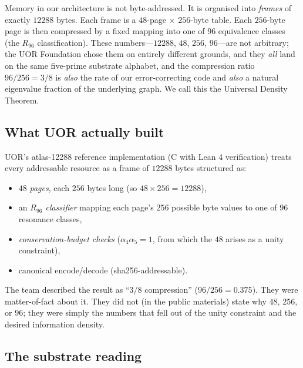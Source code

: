 \documentclass[11pt,letterpaper]{article}
\theoremstyle{remark}
\begin{document}
\begin{plainenglish}
Memory in our architecture is not byte-addressed. It is organised into \emph{frames} of
exactly $12288$ bytes. Each frame is a $48$-page $\times$ $256$-byte table. Each
$256$-byte page is then compressed by a fixed mapping into one of $96$ equivalence
classes (the $R_{96}$ classification). These numbers---$12288$, $48$, $256$, $96$---are
not arbitrary; the UOR Foundation chose them on entirely different grounds, and they
\emph{all} land on the same five-prime substrate alphabet, and the compression ratio
$96/256 = 3/8$ is \emph{also} the rate of our error-correcting code and \emph{also} a
natural eigenvalue fraction of the underlying graph. We call this the Universal Density
Theorem.
\end{plainenglish}

\subsection{What UOR actually built}

UOR's atlas-12288 reference implementation (C with Lean 4 verification) treats every
addressable resource as a frame of $12288$ bytes structured as:
\begin{itemize}[leftmargin=2em,nosep]
\item $48$ \emph{pages}, each $256$ bytes long (so $48 \times 256 = 12288$),
\item an \emph{$R_{96}$ classifier} mapping each page's $256$ possible byte values to one
of $96$ resonance classes,
\item \emph{conservation-budget checks} (\.{$\alpha_4 \alpha_5 = 1$}, from which the $48$
arises as a unity constraint),
\item canonical encode/decode (sha256-addressable).
\end{itemize}
The team described the result as ``$3/8$ compression'' ($96 / 256 = 0.375$). They were
matter-of-fact about it. They did not (in the public materials) state why $48$, $256$, or
$96$; they were simply the numbers that fell out of the unity constraint and the desired
information density.

\subsection{The substrate reading}
\end{document}
